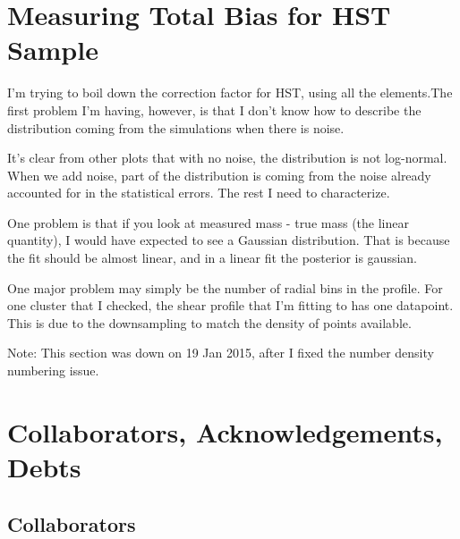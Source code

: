 \documentclass[11pt]{article}
\begin{document}
\section{Measuring Total Bias for HST Sample}

I'm trying to boil down the correction factor for HST, using all the elements.The first problem I'm having, however, is that I don't know how to describe the distribution coming from the simulations when there is noise.

It's clear from other plots that with no noise, the distribution is not log-normal. When we add noise, part of the distribution is coming from the noise already accounted for in the statistical errors. The rest I need to characterize.

One problem is that if you look at measured mass - true mass (the linear quantity), I would have expected to see a Gaussian distribution. That is because the fit should be almost linear, and in a linear fit the posterior is gaussian. 

One major problem may simply be the number of radial bins in the profile. For one cluster that I checked, the shear profile that I'm fitting to has one datapoint. This is due to the downsampling to match the density of points available. 

Note: This section was down on 19 Jan 2015, after I fixed the number density numbering issue.






\clearpage \newpage

\section{Collaborators, Acknowledgements, Debts}

\subsection{Collaborators}
\end{document}
